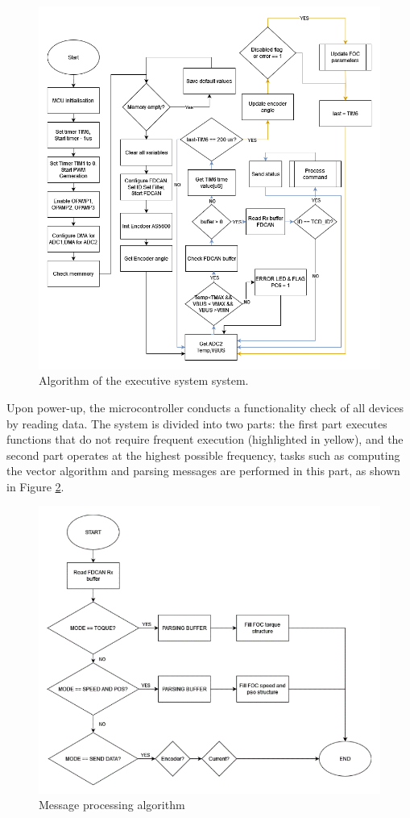 \begin{figure}[H]
	\centering
	\includegraphics[width=\textwidth]{Src/images/ACD ALG.png}
	\caption{Algorithm of the executive system system.}
	\label{ACDALG}
\end{figure}

Upon power-up, the microcontroller conducts a functionality check of all devices by reading data. The system is divided into two parts: the first part executes functions that do not require frequent execution (highlighted in yellow), and the second part operates at the highest possible frequency, tasks such as computing the vector algorithm and parsing messages are performed in this part, as shown in Figure \ref{ACDCMDALG}.

\begin{figure}[H]
	\centering
	\includegraphics[width=\textwidth]{Src/images/ACDCMDALG.png}
	\caption{Message processing algorithm}
	\label{ACDCMDALG}
\end{figure}

